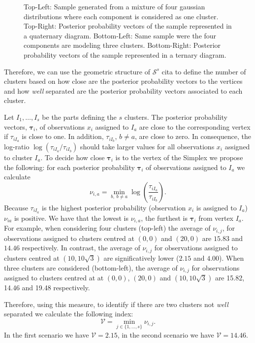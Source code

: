 \documentclass[submit]{smj}
\theoremstyle{definition}
\newcommand{\m}[1]{\boldsymbol{#1}}
\begin{document}
\begin{figure}[thbp]
\begin{center}
\begin{tabular}{cc}
 \end{tabular}
 \caption{Top-Left: Sample generated from a mixture of four gaussian distributions where each component is considered as one cluster. Top-Right: Posterior probability vectors of the sample represented in a quaternary diagram. Bottom-Left: Same sample were the four components are modeling three clusters. Bottom-Right: Posterior probability vectors of the sample represented in a ternary diagram.}\label{cluster_post}
\end{center}
\end{figure}

Therefore, we can use the geometric structure of $\mathcal{S}^s$ {\color{red}cita} to define the number of clusters based on how close are the posterior probability vectors to the vertices and how \emph{well} separated are the posterior probability vectors associated to each cluster.

Let $I_1,\dots, I_s$ be the parts defining the $s$ clusters. The posterior probability vectors, $\m\tau_i$, of observations $x_i$ assigned to $I_a$ are close to the corresponding vertex if $\tau_{i I_a}$ is close to one. In addition, $\tau_{i I_b}$, $b \neq a$, are close to zero. In consequence, the log-ratio $\log(\tau_{i I_a}/\tau_{iI_b})$ should take larger values for all observations $x_i$ assigned to cluster $I_a$. To decide how close $\m\tau_i$ is to the vertex of the Simplex we propose the following: for each posterior probability $\m\tau_i$ of observations assigned to $I_a$ we calculate
\[
\nu_{i, a} = \min_{b,\;b \neq a}  \log(\frac{\tau_{i I_a}}{\tau_{iI_b}}).
\]
Because $\tau_{i I_a}$ is the highest posterior probability (observation $x_i$ is assigned to $I_a$) $\nu_{i a}$ is positive. We have that the lowest is $\nu_{i, a}$, the furthest is $\m\tau_{i}$ from vertex $I_a$. For example, when considering four clusters (top-left) the average of $\nu_{i, j}$, for observations assigned to clusters centred  at $(0,0)$ and $(20, 0)$ are $15.83$ and $14.46$ respectively. In contrast, the average of $\nu_{i, j}$ for observations assigned to clusters centred at $(10, 10\sqrt{3})$ are significatively lower ($2.15$ and $4.00$). When three clusters are considered (bottom-left), the average of $\nu_{i, j}$ for observations assigned to clusters centred at at $(0,0)$, $(20, 0)$ and $(10, 10\sqrt{3})$ are 15.82, 14.46 and 19.48 respectively. 

Therefore, using this measure, to identify if there are two clusters not \emph{well} separated we calculate the following index:
\[
\mathcal{V} = \min_{j \in \{1,\dots, s\}} \nu_{i, j}.
\]
In the first scenario we have $\mathcal{V} = 2.15$, in the second scenario we have  $\mathcal{V} = 14.46$.
\end{document}
